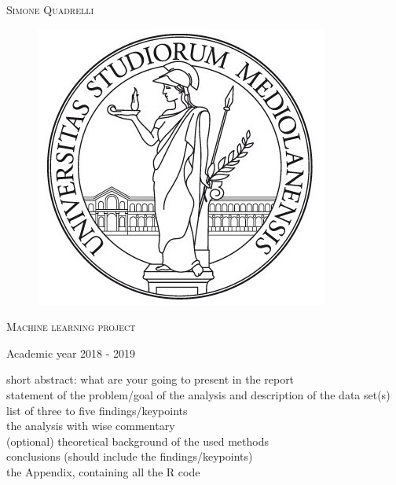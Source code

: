 \documentclass{article}
\begin{document}
\begin{titlepage}
	
	
	\begin{center}
		\vspace{2 cm}
		{\Large \textsc{Simone Quadrelli} }
	\end{center}
	
	
	\begin{figure}[H]
		\vspace{2 cm}
		\centering
		\includegraphics[width=0.30\linewidth]{tesiSCIENZE_TECNOLOGIE.jpg}
		
	\end{figure}
	
	\begin{center}
		\vspace{2 cm}
		{\Large \textsc{Machine learning project} }
	\end{center}

	\par
	\vspace{3 cm}
	
	\begin{center}
		{\large Academic year 2018 - 2019}
	\end{center}
\end{titlepage}

\newpage 
{}
\tableofcontents
\listoftables
\listoffigures
\newpage

short abstract: what are your going to present in the report \\
statement of the problem/goal of the analysis and description of the data set(s) \\
list of three to five findings/keypoints \\
the analysis with wise commentary  \\
(optional) theoretical background of the used methods \\
conclusions (should include the findings/keypoints) \\
the Appendix, containing all the R code \\
\end{document}
